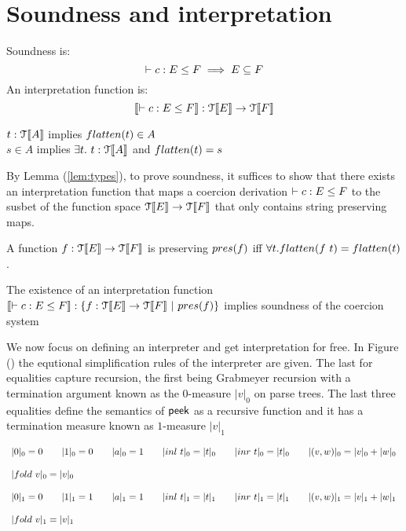 \documentclass[a4paper,UKenglish,cleveref, autoref, thm-restate]{lipics-v2021}
\begin{document}
\section{Soundness and interpretation}
Soundness is:
\[\contains{}{c}{E}{F} \implies E \subseteq F\]
An interpretation function is:
\[\interp{ \contains{}{c}{E}{F}} : \type{E} \rightarrow \type{F}\]
\begin{lemma}\label{lem:types}
$t : \mathcal{T}\llbracket A \rrbracket$ implies $\flatten{t} \in A$\\
$s \in A$ implies $\exists t.~t : \mathcal{T}\llbracket A \rrbracket$ and $\flatten{t} = s$
\end{lemma}
By Lemma (\ref{lem:types}), to prove soundness, it suffices to show that there exists an interpretation function that maps a coercion derivation $\contains{}{c}{E}{F}$ to the susbet of the function space $\mathcal{T}\llbracket E \rrbracket \rightarrow \mathcal{T}\llbracket F \rrbracket$ that only contains string preserving maps.
\begin{definition}
A function $f :\mathcal{T}\llbracket E \rrbracket \rightarrow \mathcal{T}\llbracket F \rrbracket$ is preserving $\pres{f}$ iff $\forall t. \flatten{f~t} = \flatten{t}$.\\
\end{definition}
\begin{lemma}
The existence of an interpretation function $\interp{ \contains{}{c}{E}{F}} : \{f : \type{E} \rightarrow \type{F}~ |~ \pres{f} \}$ implies soundness of the coercion system
\end{lemma}
We now focus on defining an interpreter and get interpretation for free. In Figure (\label{fig:interp}) the equtional simplification rules of the interpreter are given. The last for equalities capture recursion, the first being Grabmeyer recursion with a termination argument known as the $0$-measure $|v|_0$ on parse trees. The last three equalities define the semantics of $\textsf{peek}$ as a recursive function and it has a termination measure known as $1$-measure $|v|_1$ 
\begin{definition}
  \begin{displaymath}
    \begin{array}{lll}
      \zerom{0} = 0 \qquad \zerom{1} = 0 \qquad \zerom{a} = 1 \qquad \zerom{inl~ t} = \zerom{t} \qquad \zerom{inr~ t} = \zerom{t} \qquad
     \zerom{(v,w)}=\zerom{v}+\zerom{w} \\\\ \zerom{fold~v}=\zerom{v}\\\\
    \onem{0} = 0 \qquad \onem{1} = 1 \qquad \onem{a} = 1 \qquad \onem{inl~ t} = \onem{t} \qquad \onem{inr~ t} = \onem{t} \qquad
     \onem{(v,w)}=\onem{v}+\onem{w} \\\\ \onem{fold~v}=\onem{v}
    \end{array}
  \end{displaymath}
\end{definition}
\end{document}
